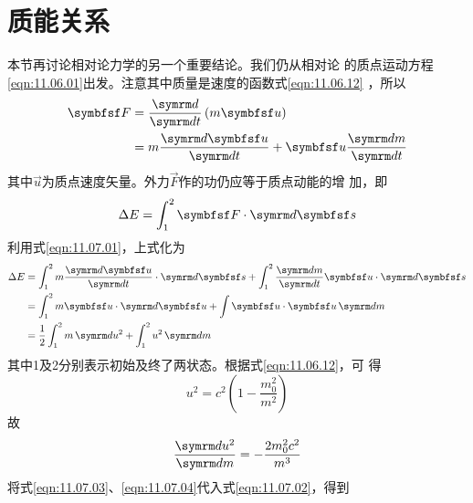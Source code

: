 \section[质能关系]{质\hspace{0.333em}能\hspace{0.333em}关\hspace{0.333em}系}\label{sec:11.07}

本节再讨论相对论力学的另一个重要结论。我们仍从相对论
的质点运动方程\eqref{eqn:11.06.01}出发。注意其中质量是速度的函数式\lhbrak \eqref{eqn:11.06.12} \rhbrak ，所以
\begin{equation}\label{eqn:11.07.01}
    \begin{split}
        \vec{F} &= \frac {  \dif } {  \dif t } \left( m \vec{u} \right) \\
          &= m \frac {  \dif \vec{u} } {  \dif t } + \vec{u} \frac {  \dif m } {  \dif t }
    \end{split}
\end{equation}
其中$ \vec{u} $为质点速度矢量。外力$\vec{F}$作的功仍应等于质点动能的增
加，即
\begin{equation*}
    \Delta E = \int _ 1 ^ 2 \vec{F} \cdot  \dif \vec{s}
\end{equation*}
利用式\eqref{eqn:11.07.01}，上式化为
\begin{equation}\label{eqn:11.07.02}
    \begin{aligned}
        \Delta E &=\int_{1}^{2} m \frac{ \dif \vec{u}}{ \dif t} \cdot  \dif \vec{s}+\int_{1}^{2} \frac{ \dif m}{ \dif t} \vec{u } \cdot  \dif \vec{s} \\
        &=\int_{1}^{2} m \vec{u} \cdot  \dif \vec{u}+\int \vec{u} \cdot \vec{u}  \dif m \\
        &=\frac{1}{2} \int_{1}^{2} m  \dif u^{2}+\int_{1}^{2} u^{2}  \dif m
    \end{aligned}
\end{equation}
其中1及2分别表示初始及终了两状态。根据式\eqref{eqn:11.06.12}，可
得
\begin{equation}\label{eqn:11.07.03}
    u ^ { 2 } = c ^ { 2 } \left( 1 - \frac { m _ { 0 } ^ { 2 } } { m ^ { 2 } } \right)
\end{equation}
故
\begin{equation}\label{eqn:11.07.04}
    \frac{ \dif u^{2}}{ \dif m}=-\frac{2 m_{0}^{2} c^{2}}{m^{3}}
\end{equation}
将式\eqref{eqn:11.07.03}、\eqref{eqn:11.07.04}代入式\eqref{eqn:11.07.02}，得到

